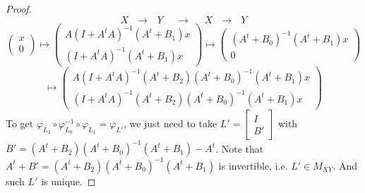 \documentclass[10pt,a4paper]{amsart}
\begin{document}
\begin{proof}
\[
X  ~  ~   ~ \longrightarrow  ~  ~   ~ Y  ~  ~   ~ ~  ~   ~\longrightarrow ~  ~   ~ ~  ~   ~ X~  ~   ~ \longrightarrow  ~  ~   ~ Y
\]
\[
\left(
\begin{array}{cc}
x \\
0 \end{array} \right) \mapsto   \left(
\begin{array}{cc}
A(I+A^tA)^{-1}(A^t+B_1)x \\
(I+A^tA)^{-1}(A^t+B_1)x \end{array} \right)
\mapsto   \left(
\begin{array}{cc}
(A^t+B_0)^{-1}(A^t+B_1)x \\
0 \end{array} \right)
\]
\[
 \mapsto   \left(
\begin{array}{cc}
A(I+A^tA)^{-1}(A^t+B_2)(A^t+B_0)^{-1}(A^t+B_1)x \\
(I+A^tA)^{-1}(A^t+B_2)(A^t+B_0)^{-1}(A^t+B_1)x \end{array} \right)
\]
To get $\varphi_{L_2}\circ \varphi_{L_0}^{-1}\circ \varphi_{L_1}=\varphi_{L'}$, we just need to take $L'=\left[
\begin{array}{cc}
I \\
B' \end{array} \right]$ with $B'=(A^t+B_2)(A^t+B_0)^{-1}(A^t+B_1)-A^t$. Note that $A^t+B'=(A^t+B_2)(A^t+B_0)^{-1}(A^t+B_1)$ is invertible,
i.e. $L' \in M_{XY}$. And such $L'$ is unique.
\end{proof}
\end{document}
